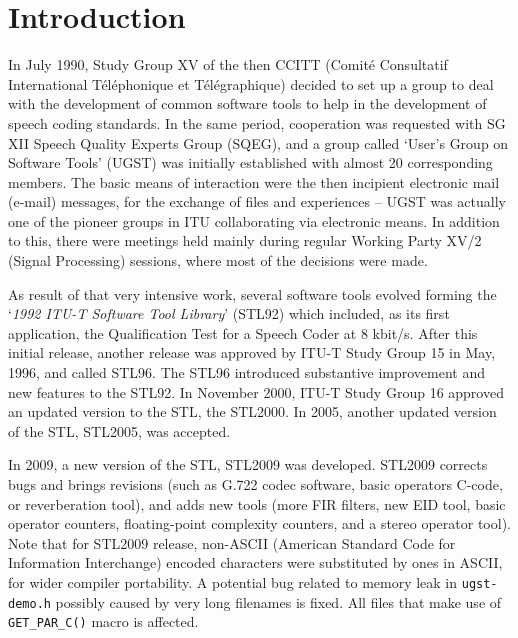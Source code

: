 

\chapter{Introduction}

In July 1990, Study Group XV of the then CCITT (Comit\'e Consultatif International T\'el\'epho\-nique et T\'el\'egraphique) decided to set up a group to deal with the development of common software tools to help in the development of speech coding standards.
In the same period, cooperation was requested with SG XII Speech Quality Experts Group (SQEG), and a group called `{U}ser's Group on Software Tools' (UGST) was initially established with almost 20 corresponding members.
The basic means of interaction were the then incipient electronic mail (e-mail) messages, for the exchange of files and experiences -- UGST was actually one of the pioneer groups in ITU collaborating via electronic means.
In addition to this, there were meetings held mainly during regular Working Party XV/2 (Signal Processing) sessions, where most of the decisions were made.

As result of that very intensive work, several software tools evolved forming the `{\em 1992 ITU-T Software Tool Library}' (STL92) which
included, as its first application, the Qualification Test for a Speech Coder at 8 kbit/s.
After this initial release, another release was approved by ITU-T Study Group 15 in May, 1996, and called STL96.
The STL96 introduced substantive improvement and new features to the STL92.
In November 2000, ITU-T Study Group 16 approved an updated version to the STL, the STL2000.
In 2005, another updated version of the STL, STL2005, was accepted.

In 2009, a new version of the STL, STL2009 was developed.
STL2009 corrects bugs and brings revisions (such as G.722 codec software, basic operators C-code, or reverberation tool), and adds new tools (more FIR filters, new EID tool, basic operator counters, floating-point complexity counters, and a stereo operator tool).
Note that for STL2009 release, non-ASCII (American Standard Code for Information Interchange) encoded characters were substituted by ones in ASCII, for wider compiler portability.
A potential bug related to memory leak in \texttt{ugst-demo.h} possibly caused by very long filenames is fixed.
All files that make use of \texttt{GET\_PAR\_C()} macro is affected.

